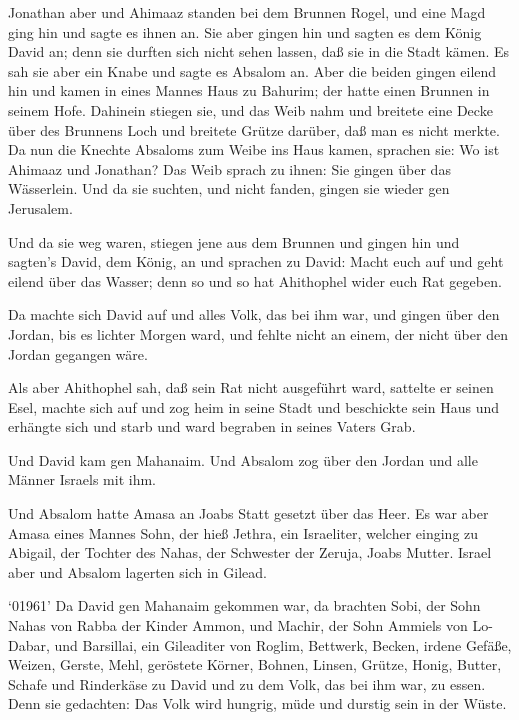 Jonathan aber und Ahimaaz standen bei dem Brunnen Rogel,
und eine Magd ging hin und sagte es ihnen an. Sie aber gingen hin und
sagten es dem König David an; denn sie durften sich nicht sehen lassen,
daß sie in die Stadt kämen.  Es sah sie aber ein Knabe und
sagte es Absalom an. Aber die beiden gingen eilend hin und kamen in
eines Mannes Haus zu Bahurim; der hatte einen Brunnen in seinem Hofe.
Dahinein stiegen sie,  und das Weib nahm und breitete eine
Decke über des Brunnens Loch und breitete Grütze darüber, daß man es
nicht merkte.  Da nun die Knechte Absaloms zum Weibe ins
Haus kamen, sprachen sie: Wo ist Ahimaaz und Jonathan? Das Weib sprach
zu ihnen: Sie gingen über das Wässerlein. Und da sie suchten, und nicht
fanden, gingen sie wieder gen Jerusalem.

 Und da sie weg waren, stiegen jene aus dem Brunnen und
gingen hin und sagten's David, dem König, an und sprachen zu David:
Macht euch auf und geht eilend über das Wasser; denn so und so hat
Ahithophel wider euch Rat gegeben.

 Da machte sich David auf und alles Volk, das bei ihm war,
und gingen über den Jordan, bis es lichter Morgen ward, und fehlte nicht
an einem, der nicht über den Jordan gegangen wäre.

 Als aber Ahithophel sah, daß sein Rat nicht ausgeführt
ward, sattelte er seinen Esel, machte sich auf und zog heim in seine
Stadt und beschickte sein Haus und erhängte sich und starb und ward
begraben in seines Vaters Grab.

 Und David kam gen Mahanaim. Und Absalom zog über den
Jordan und alle Männer Israels mit ihm.

 Und Absalom hatte Amasa an Joabs Statt gesetzt über das
Heer. Es war aber Amasa eines Mannes Sohn, der hieß Jethra, ein
Israeliter, welcher einging zu Abigail, der Tochter des Nahas, der
Schwester der Zeruja, Joabs Mutter.  Israel aber und
Absalom lagerten sich in Gilead.

 `01961' Da David gen Mahanaim gekommen war, da brachten
Sobi, der Sohn Nahas von Rabba der Kinder Ammon, und Machir, der Sohn
Ammiels von Lo-Dabar, und Barsillai, ein Gileaditer von Roglim,
 Bettwerk, Becken, irdene Gefäße, Weizen, Gerste, Mehl,
geröstete Körner, Bohnen, Linsen, Grütze,  Honig, Butter,
Schafe und Rinderkäse zu David und zu dem Volk, das bei ihm war, zu
essen. Denn sie gedachten: Das Volk wird hungrig, müde und durstig sein
in der Wüste.

